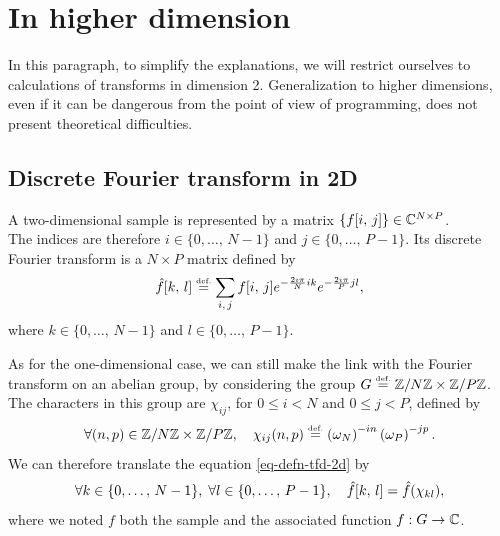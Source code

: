 \section{In higher dimension}
\label{sect1-tfd-dim-sup} 
 
 
In this paragraph, to simplify the explanations, we will restrict ourselves to calculations of transforms in dimension 2. Generalization to higher dimensions, even if it can be dangerous from the point of view of programming, does not present theoretical difficulties.
\subsection{Discrete Fourier transform in 2D}
\label{sect2-transforme-discrete-2d} 
 
 
\begin{defn}
A two-dimensional sample is represented by a matrix $ \left\{f[i, \, j] \right\} \in \mathbb{C}^{N \times P} $. \\The indices are therefore $ i \in \{0, \ldots, \, N-1\} $ and $ j \in \{0, \ldots, \, P-1\} $. Its discrete Fourier transform is a $ N \times P $ matrix defined by
\begin{equation}
\label{eq-defn-tfd-2d}
\hat{f}[k, \, l] \stackrel{\mbox{\upshape\tiny def.}}{=} \sum_{i, \, j}{f[i, \, j] e^{- \frac{2 \imath \pi}{N} ik} e^{- \frac{2 \imath \pi}{P} jl}},
\end{equation}
where $ k \in \{0, \ldots, \, N-1\} $ and $ l \in \{0, \ldots, \, P-1\} $.
\end{defn}
As for the one-dimensional case, we can still make the link with the Fourier transform on an abelian group, by considering the group $ G \stackrel{\mbox{\upshape\tiny def.}}{=} \mathbb{Z}/N \mathbb{Z} \times \mathbb{Z}/P \mathbb{Z} $. The characters in this group are $ \chi_{ij} $, for $ 0 \leq i <N $ and $ 0 \leq j <P $, defined by
\begin{equation*}
\forall (n, p) \in \mathbb{Z}/N \mathbb{Z} \times \mathbb{Z}/P \mathbb{Z}, \quad \chi_{ij} (n, p) \stackrel{\mbox{\upshape\tiny def.}}{=} \left(\omega_N \right)^{- in } \left(\omega_P \right)^{- jp}.
\end{equation*}
We can therefore translate the equation \eqref{eq-defn-tfd-2d} by
\begin{equation*}
\forall k \in \{0, \ldots, \, N-1\}, \; \forall l \in \{0, \ldots, \, P-1\}, \quad \hat{f}[k, \, l] = \hat{f} (\chi_{kl}),
\end{equation*}
where we noted $ f $ both the sample and the associated function $ f: G \rightarrow \mathbb{C} $.
 
